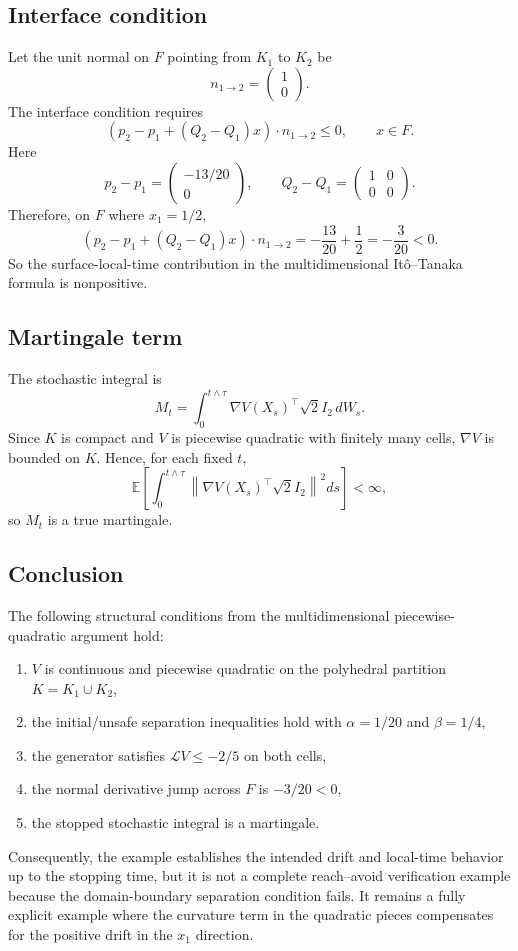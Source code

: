 \documentclass[10pt]{extarticle}
\begin{document}
\subsection{Interface condition}

Let the unit normal on $F$ pointing from $K_1$ to $K_2$ be
\[
  n_{1\to2}=
  \begin{pmatrix}1\\0\end{pmatrix}.
\]
The interface condition requires
\[
  \left(p_2-p_1+(Q_2-Q_1)x\right)\cdot n_{1\to2}\leq0,
  \qquad x\in F.
\]
Here
\[
  p_2-p_1=
  \begin{pmatrix}
    -13/20\\0
  \end{pmatrix},
  \qquad
  Q_2-Q_1=
  \begin{pmatrix}
    1&0\\
    0&0
  \end{pmatrix}.
\]
Therefore, on $F$ where $x_1=1/2$,
\[
  \left(p_2-p_1+(Q_2-Q_1)x\right)\cdot n_{1\to2}
  =
  -\frac{13}{20}+\frac12
  =
  -\frac{3}{20}
  <0.
\]
So the surface-local-time contribution in the multidimensional
It\^o--Tanaka formula is nonpositive.

\subsection{Martingale term}

The stochastic integral is
\[
  M_t
  =
  \int_0^{t\wedge\tau}
  \nabla V(X_s)^\top\sqrt{2}I_2\,dW_s.
\]
Since $K$ is compact and $V$ is piecewise quadratic with finitely many cells,
$\nabla V$ is bounded on $K$. Hence, for each fixed $t$,
\[
  \mathbb E\left[
    \int_0^{t\wedge\tau}
    \left\|
      \nabla V(X_s)^\top\sqrt{2}I_2
    \right\|^2ds
  \right]
  <\infty,
\]
so $M_t$ is a true martingale.

\subsection{Conclusion}

The following structural conditions from the multidimensional
piecewise-quadratic argument hold:
\begin{enumerate}
  \item $V$ is continuous and piecewise quadratic on the polyhedral partition
  $K=K_1\cup K_2$,
  \item the initial/unsafe separation inequalities hold with
  $\alpha=1/20$ and $\beta=1/4$,
  \item the generator satisfies $\mathcal LV\leq-2/5$ on both cells,
  \item the normal derivative jump across $F$ is $-3/20<0$,
  \item the stopped stochastic integral is a martingale.
\end{enumerate}
Consequently, the example establishes the intended drift and local-time
behavior up to the stopping time, but it is not a complete reach--avoid
verification example because the domain-boundary separation condition fails.
It remains a fully explicit example where the curvature term in the quadratic
pieces compensates for the positive drift in the $x_1$ direction.
\end{document}
